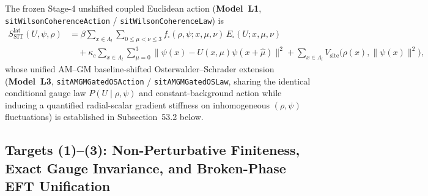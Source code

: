 The frozen Stage-4 unshifted coupled Euclidean action (\textbf{Model~L1}, \texttt{sit\allowbreak{}Wilson\allowbreak{}Coherence\allowbreak{}Action} / \texttt{sitWilsonCoherenceLaw}) is
\begin{equation}
\begin{aligned}
S_{\mathrm{SIT}}^{\mathrm{lat}}(U,\psi,\rho)
&= \beta\sum_{x\in\Lambda_l}\sum_{0\le\mu<\nu\le 3} f_\square(\rho,\psi;x,\mu,\nu)\,E_\square(U;x,\mu,\nu)\\
&\quad + \kappa_c\sum_{x\in\Lambda_l}\sum_{\mu=0}^3 \bigl\|\psi(x) - U(x,\mu)\psi(x+\hat{\mu})\bigr\|^2
  + \sum_{x\in\Lambda_l} V_{\mathrm{site}}\bigl(\rho(x), \|\psi(x)\|^2\bigr),
\end{aligned}
\label{eq:full_sit_lattice_action}
\end{equation}
whose unified AM--GM baseline-shifted Osterwalder--Schrader extension (\textbf{Model~L3}, \texttt{sitAMGMGatedOSAction} / \texttt{sitAMGMGatedOSLaw}, sharing the identical conditional gauge law $P(U\mid\rho,\psi)$ and constant-background action while inducing a quantified radial-scalar gradient stiffness on inhomogeneous $(\rho,\psi)$ fluctuations) is established in Subsection~53.2 below.

\subsection{Targets (1)--(3): Non-Perturbative Finiteness, Exact Gauge Invariance, and Broken-Phase EFT Unification}

